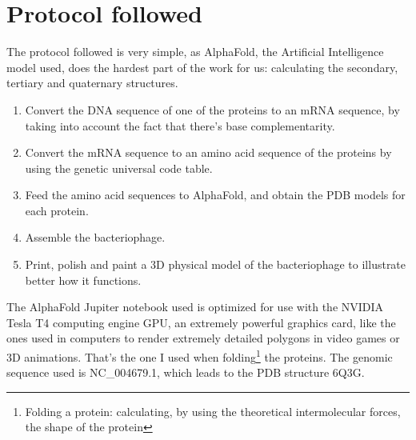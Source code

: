 \section{Protocol followed}
The protocol followed is very simple, as AlphaFold, the Artificial Intelligence model used, does the hardest part of the work for us: calculating the secondary, tertiary and quaternary structures.
\begin{enumerate}[label=\arabic*)]
\item Convert the DNA sequence of one of the proteins to an mRNA sequence, by taking into account the fact that there's base complementarity.
\item Convert the mRNA sequence to an amino acid sequence of the proteins by using the genetic universal code table.
\item Feed the amino acid sequences to AlphaFold, and obtain the PDB models for each protein.
\item Assemble the bacteriophage.
\item Print, polish and paint a 3D physical model of the bacteriophage to illustrate better how it functions.
\end{enumerate}
The AlphaFold Jupiter notebook\cite{GoogleColaboratoryAlpha-} used is optimized for use with the NVIDIA Tesla T4 computing engine GPU, an extremely powerful graphics card, like the ones used in computers to render extremely detailed polygons in video games or 3D animations. That's the one I used when folding\footnote{Folding a protein: calculating, by using the theoretical intermolecular forces, the shape of the protein} the proteins. The genomic sequence used is NC\_004679.1, which leads to the PDB structure 6Q3G.

